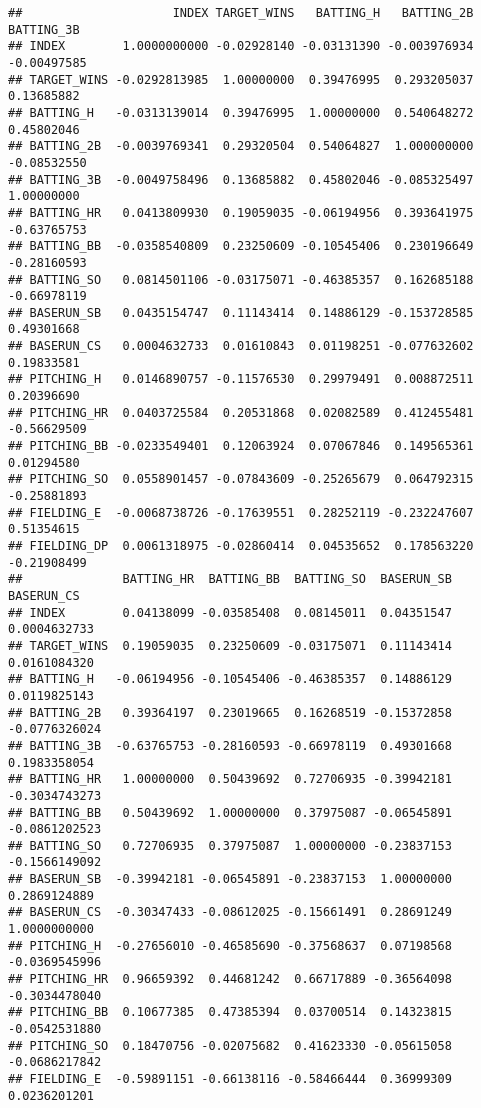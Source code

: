 \documentclass[
]{article}
\begin{document}
\begin{verbatim}
##                     INDEX TARGET_WINS   BATTING_H   BATTING_2B  BATTING_3B
## INDEX        1.0000000000 -0.02928140 -0.03131390 -0.003976934 -0.00497585
## TARGET_WINS -0.0292813985  1.00000000  0.39476995  0.293205037  0.13685882
## BATTING_H   -0.0313139014  0.39476995  1.00000000  0.540648272  0.45802046
## BATTING_2B  -0.0039769341  0.29320504  0.54064827  1.000000000 -0.08532550
## BATTING_3B  -0.0049758496  0.13685882  0.45802046 -0.085325497  1.00000000
## BATTING_HR   0.0413809930  0.19059035 -0.06194956  0.393641975 -0.63765753
## BATTING_BB  -0.0358540809  0.23250609 -0.10545406  0.230196649 -0.28160593
## BATTING_SO   0.0814501106 -0.03175071 -0.46385357  0.162685188 -0.66978119
## BASERUN_SB   0.0435154747  0.11143414  0.14886129 -0.153728585  0.49301668
## BASERUN_CS   0.0004632733  0.01610843  0.01198251 -0.077632602  0.19833581
## PITCHING_H   0.0146890757 -0.11576530  0.29979491  0.008872511  0.20396690
## PITCHING_HR  0.0403725584  0.20531868  0.02082589  0.412455481 -0.56629509
## PITCHING_BB -0.0233549401  0.12063924  0.07067846  0.149565361  0.01294580
## PITCHING_SO  0.0558901457 -0.07843609 -0.25265679  0.064792315 -0.25881893
## FIELDING_E  -0.0068738726 -0.17639551  0.28252119 -0.232247607  0.51354615
## FIELDING_DP  0.0061318975 -0.02860414  0.04535652  0.178563220 -0.21908499
##              BATTING_HR  BATTING_BB  BATTING_SO  BASERUN_SB    BASERUN_CS
## INDEX        0.04138099 -0.03585408  0.08145011  0.04351547  0.0004632733
## TARGET_WINS  0.19059035  0.23250609 -0.03175071  0.11143414  0.0161084320
## BATTING_H   -0.06194956 -0.10545406 -0.46385357  0.14886129  0.0119825143
## BATTING_2B   0.39364197  0.23019665  0.16268519 -0.15372858 -0.0776326024
## BATTING_3B  -0.63765753 -0.28160593 -0.66978119  0.49301668  0.1983358054
## BATTING_HR   1.00000000  0.50439692  0.72706935 -0.39942181 -0.3034743273
## BATTING_BB   0.50439692  1.00000000  0.37975087 -0.06545891 -0.0861202523
## BATTING_SO   0.72706935  0.37975087  1.00000000 -0.23837153 -0.1566149092
## BASERUN_SB  -0.39942181 -0.06545891 -0.23837153  1.00000000  0.2869124889
## BASERUN_CS  -0.30347433 -0.08612025 -0.15661491  0.28691249  1.0000000000
## PITCHING_H  -0.27656010 -0.46585690 -0.37568637  0.07198568 -0.0369545996
## PITCHING_HR  0.96659392  0.44681242  0.66717889 -0.36564098 -0.3034478040
## PITCHING_BB  0.10677385  0.47385394  0.03700514  0.14323815 -0.0542531880
## PITCHING_SO  0.18470756 -0.02075682  0.41623330 -0.05615058 -0.0686217842
## FIELDING_E  -0.59891151 -0.66138116 -0.58466444  0.36999309  0.0236201201

\end{verbatim}
\end{document}
